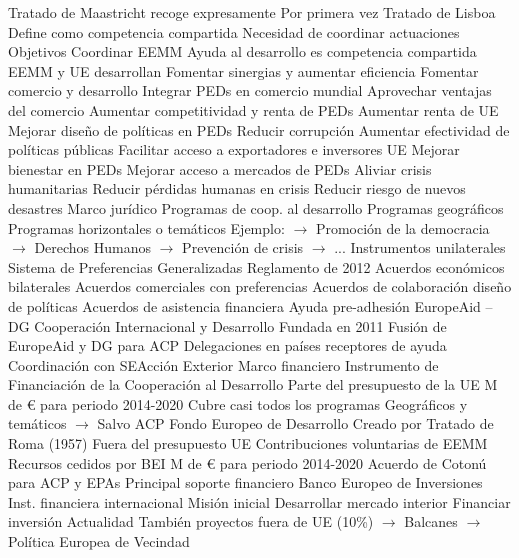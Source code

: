 \documentclass{nuevotema}
\begin{document}
\begin{esquemal}
				\4 Tratado de Maastricht recoge expresamente
				\4[] Por primera vez
			\3 Tratado de Lisboa
				\4 Define como competencia compartida
				\4[$\then$] Necesidad de coordinar actuaciones
		\2 Objetivos
			\3 Coordinar EEMM
				\4 Ayuda al desarrollo es competencia compartida
				\4[] EEMM y UE desarrollan
				\4 Fomentar sinergias y aumentar eficiencia
			\3 Fomentar comercio y desarrollo
				\4 Integrar PEDs en comercio mundial
				\4 Aprovechar ventajas del comercio
				\4 Aumentar competitividad y renta de PEDs
				\4[$\then$] Aumentar renta de UE
			\3 Mejorar diseño de políticas en PEDs
				\4 Reducir corrupción
				\4 Aumentar efectividad de políticas públicas
				\4 Facilitar acceso a exportadores e inversores UE
				\4[$\then$] Mejorar bienestar en PEDs
				\4[$\then$] Mejorar acceso a mercados de PEDs
			\3 Aliviar crisis humanitarias
				\4 Reducir pérdidas humanas en crisis
				\4 Reducir riesgo de nuevos desastres
		\2 Marco jurídico
			\3 Programas de coop. al desarrollo
				\4 Programas geográficos
				\4 Programas horizontales o temáticos
				\4[] Ejemplo:
				\4[] $\to$ Promoción de la democracia
				\4[] $\to$ Derechos Humanos
				\4[] $\to$ Prevención de crisis
				\4[] $\to$ ...
			\3 Instrumentos unilaterales
				\4 Sistema de Preferencias Generalizadas
				\4[] Reglamento de 2012
			\3 Acuerdos económicos bilaterales
				\4 Acuerdos comerciales con preferencias
				\4 Acuerdos de colaboración diseño de políticas
				\4 Acuerdos de asistencia financiera
				\4 Ayuda pre-adhesión
			\3 EuropeAid -- DG Cooperación Internacional y Desarrollo
				\4 Fundada en 2011
				\4[] Fusión de EuropeAid y DG para ACP
				\4 Delegaciones en países receptores de ayuda
				\4 Coordinación con SEAcción Exterior
		\2 Marco financiero
			\3 Instrumento de Financiación de la Cooperación al Desarrollo
				\4 Parte del presupuesto de la UE
				 M de € para periodo 2014-2020
				\4 Cubre casi todos los programas
				\4[] Geográficos y temáticos
				\4[] $\to$ Salvo ACP
			\3 Fondo Europeo de Desarrollo
				\4 Creado por Tratado de Roma (1957)
				\4 Fuera del presupuesto UE
				\4[] Contribuciones voluntarias de EEMM
				\4[] Recursos cedidos por BEI
				 M de € para periodo 2014-2020
				\4 Acuerdo de Cotonú para ACP y EPAs
				\4[] Principal soporte financiero
			\3 Banco Europeo de Inversiones
				\4 Inst. financiera internacional
				\4 Misión inicial
				\4[] Desarrollar mercado interior
				\4[] Financiar inversión
				\4 Actualidad
				\4[] También proyectos fuera de UE (10\%)
				\4[] $\to$ Balcanes
				\4[] $\to$ Política Europea de Vecindad

\end{esquemal}
\end{document}
